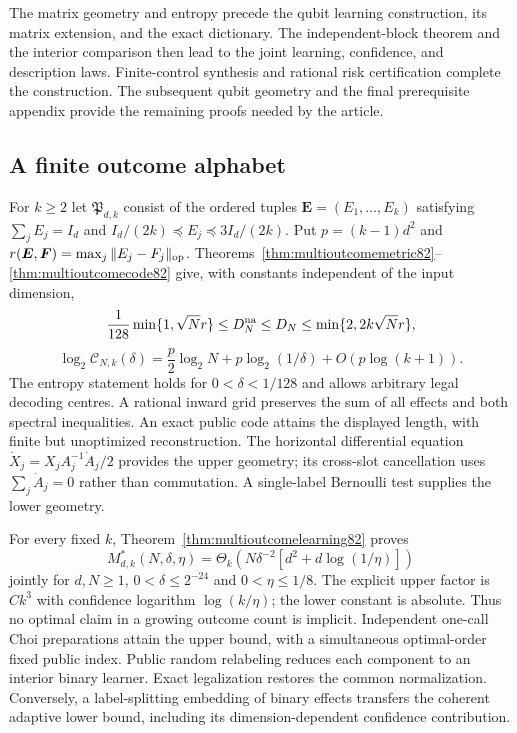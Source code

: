 The matrix geometry and entropy precede the qubit learning
construction, its matrix extension, and the exact dictionary.
The independent-block theorem and the interior comparison then
lead to the joint learning, confidence, and description laws.
Finite-control synthesis and rational risk certification complete
the construction.  The subsequent qubit geometry and the final
prerequisite appendix provide the remaining proofs needed by the
article.


\subsection{A finite outcome alphabet}
For $k\ge2$ let $\mathfrak P_{d,k}$ consist of the ordered tuples
$\boldsymbol E=(E_1,\ldots,E_k)$ satisfying
$\sum_jE_j=I_d$ and $I_d/(2k)\preceq E_j\preceq3I_d/(2k)$.
Put $p=(k-1)d^2$ and
$r(\boldsymbol E,\boldsymbol F)=\max_j\|E_j-F_j\|_{\rm op}$.
Theorems~\ref{thm:multioutcomemetric82}--\ref{thm:multioutcomecode82}
give, with constants independent of the input dimension,
\[
 \frac1{128}\min\{1,\sqrt N r\}
 \le D_N^{\rm na}\le D_N\le\min\{2,2k\sqrt N r\},
\]
\[
 \log_2\mathcal C_{N,k}(\delta)
 =\frac p2\log_2N+p\log_2(1/\delta)+O(p\log(k+1)).
\]
The entropy statement holds for $0<\delta<1/128$ and allows arbitrary
legal decoding centres.  A rational inward grid preserves the sum of
all effects and both spectral inequalities.  An exact public code
attains the displayed length, with finite but unoptimized reconstruction.
The horizontal differential equation
$\dot X_j=X_j A_j^{-1}\dot A_j/2$ provides the upper geometry;
its cross-slot cancellation uses $\sum_j\dot A_j=0$ rather than
commutation.  A single-label Bernoulli test supplies the lower geometry.

For every fixed $k$, Theorem~\ref{thm:multioutcomelearning82} proves
\[
 M^*_{d,k}(N,\delta,\eta)
 =\Theta_k\!\left(N\delta^{-2}[d^2+d\log(1/\eta)]\right)
\]
jointly for $d,N\ge1$, $0<\delta\le2^{-24}$ and $0<\eta\le1/8$.
The explicit upper factor is $Ck^3$ with confidence logarithm
$\log(k/\eta)$; the lower constant is absolute.  Thus no optimal
claim in a growing outcome count is implicit.  Independent one-call
Choi preparations attain the upper bound, with a simultaneous
optimal-order fixed public index.  Public random relabeling reduces
each component to an interior binary learner.  Exact legalization
restores the common normalization.  Conversely, a label-splitting
embedding of binary effects transfers the coherent adaptive lower
bound, including its dimension-dependent confidence contribution.

